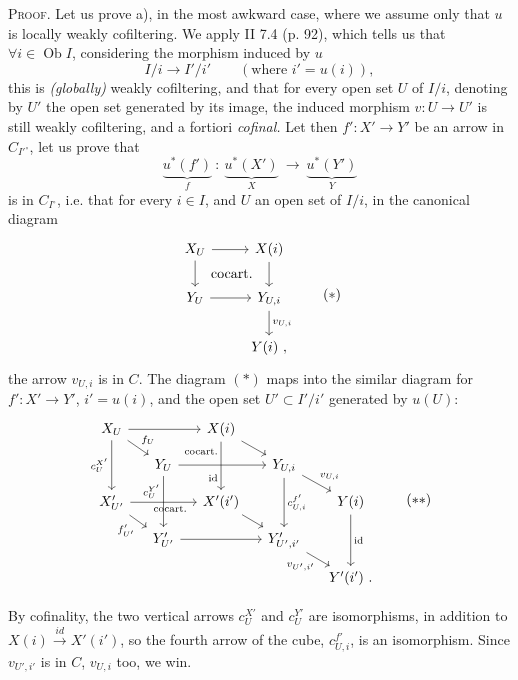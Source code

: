 \documentclass[11pt]{article}
\newcommand{\printedpage}[1]{\marginpar{\footnotesize p.~#1}}
\newcommand{\msp}[1]{\marginpar{\footnotesize [#1]}}
\begin{document}
\textsc{Proof}. Let us prove a), in the most awkward case, where we assume only that $u$ is locally weakly cofiltering. We apply II 7.4 (p. 92), which tells us that $\forall i\in\operatorname{Ob}I$,
\msp{52}
considering the morphism induced by $u$
\[
I/i \longrightarrow I'/i' \qquad (\text{where } i'=u(i)),
\]
this is \textit{(globally)} weakly cofiltering, and that for every open set $U$ of $I/i$, denoting by $U'$ the open set generated by its image, the induced morphism $v:U\longrightarrow U'$ is still weakly cofiltering, and a fortiori \textit{cofinal.} Let then $f':X'\longrightarrow Y'$ be an arrow in $C_{I'^\circ}$, let us prove that
\[
\underbrace{u^*(f')}_{f}\ :\ \underbrace{u^*(X')}_{X}\ \longrightarrow\ \underbrace{u^*(Y')}_{Y}
\]
is in $C_{I^\circ}$, i.e. that for every $i\in I$, and $U$ an open set of $I/i$, in the canonical diagram
\printedpage{27}
\[
\begin{tikzcd}
X_U \arrow[r] \arrow[d] \arrow[dr, phantom, "\text{cocart.}"] & X(i) \arrow[d] \\
Y_U \arrow[r] & Y_{U,i} \arrow[d, "v_{U,i}"] \\
& Y(i)\ ,
\end{tikzcd}
\tag*{$(*)$}
\]
\msp{53}
the arrow $v_{U,i}$ is in $C$. The diagram $(*)$ maps into the similar diagram for $f':X'\longrightarrow Y'$, $i'=u(i)$, and the open set $U'\subset I'/i'$ generated by $u(U)$:
\[
\begin{tikzcd}[column sep=small, row sep=small]
X_U \arrow[rr] \arrow[dr, "f_U"] \arrow[dd, "c_U^{X'}"'] & & X(i) \arrow[dr] \arrow[dd, "\text{cocart.}"' {pos=0.2}, "\mathrm{id}"' {pos=0.75}] & & \\
& Y_U \arrow[rr] \arrow[dd, "c_U^{Y'}"' {pos=0.3}] & & Y_{U,i} \arrow[dr, "v_{U,i}"] \arrow[dd, "c^{f'}_{U,i}"] & \\
X'_{U'} \arrow[rr, "\text{cocart.}"' {pos=0.6}] \arrow[dr, "f'_{U'}"'] & & X'(i') \arrow[dr] & & Y(i) \arrow[dd, "\mathrm{id}"] \\
& Y'_{U'} \arrow[rr] & & Y'_{U',i'} \arrow[dr, "v_{U',i'}"'] & \\
& & & & Y'(i')\ .
\end{tikzcd}
\tag*{$(**)$}
\]

By cofinality, the two vertical arrows $c_U^{X'}$ and $c_U^{Y'}$ are isomorphisms, in addition to $X(i)\xrightarrow{\ id\ }X'(i')$, so the fourth arrow of the cube, $c^{f'}_{U,i}$, is an isomorphism. Since $v_{U',i'}$ is in $C$, $v_{U,i}$ too, we win.
\end{document}
